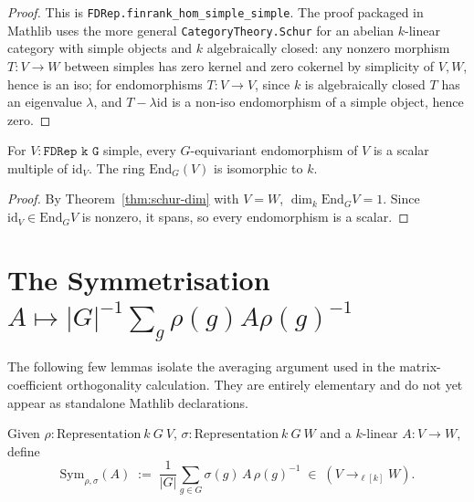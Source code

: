 \begin{proof}
  \leanok
  This is \texttt{FDRep.finrank\_hom\_simple\_simple}.  The proof packaged in
  Mathlib uses the more general \texttt{CategoryTheory.Schur} for an abelian
  $k$-linear category with simple objects and $k$ algebraically closed:
  any nonzero morphism $T : V \to W$ between simples has zero kernel and
  zero cokernel by simplicity of $V, W$, hence is an iso; for endomorphisms
  $T : V \to V$, since $k$ is algebraically closed $T$ has an eigenvalue
  $\lambda$, and $T - \lambda \mathrm{id}$ is a non-iso endomorphism of a simple
  object, hence zero.
\end{proof}

\begin{corollary}
  \label{cor:schur-scalar}
  For $V : \texttt{FDRep k G}$ simple, every $G$-equivariant endomorphism of
  $V$ is a scalar multiple of $\mathrm{id}_V$. The ring $\mathrm{End}_G(V)$ is
  isomorphic to $k$.
\end{corollary}

\begin{proof}
  By Theorem~\ref{thm:schur-dim} with $V = W$,
  $\dim_k \mathrm{End}_G V = 1$. Since $\mathrm{id}_V \in \mathrm{End}_G V$ is
  nonzero, it spans, so every endomorphism is a scalar.
\end{proof}

\section{The Symmetrisation \texorpdfstring{$A \mapsto |G|^{-1}\sum_g \rho(g) A \rho(g)^{-1}$}{A -> |G|\^{}-1 sum rho(g) A rho(g)\^{}-1}}

The following few lemmas isolate the averaging argument used in the
matrix-coefficient orthogonality calculation. They are entirely elementary
and do not yet appear as standalone Mathlib declarations.

\begin{definition}
  \label{def:symmetrisation}
  Given $\rho : \mathrm{Representation}\ k\ G\ V$,
  $\sigma : \mathrm{Representation}\ k\ G\ W$ and a $k$-linear $A : V \to W$,
  define
  \[
    \mathrm{Sym}_{\rho,\sigma}(A) \;:=\; \frac{1}{|G|}\sum_{g \in G}
        \sigma(g)\, A\, \rho(g)^{-1} \;\in\; (V \to_{\!\ell[k]} W).
  \]
\end{definition}

